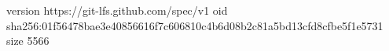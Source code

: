 version https://git-lfs.github.com/spec/v1
oid sha256:01f56478bae3e40856616f7c606810c4b6d08b2c81a5bd13cfd8cfbe5f1e5731
size 5566
